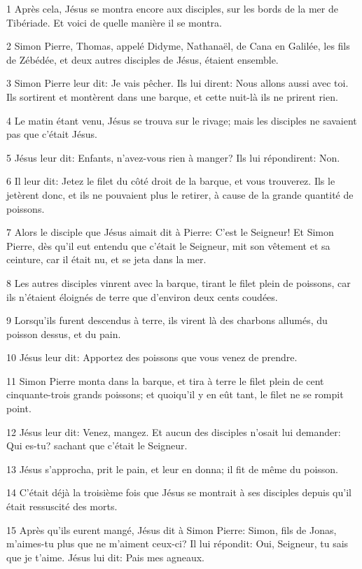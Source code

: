 \par 1 Après cela, Jésus se montra encore aux disciples, sur les bords de la mer de Tibériade. Et voici de quelle manière il se montra.
\par 2 Simon Pierre, Thomas, appelé Didyme, Nathanaël, de Cana en Galilée, les fils de Zébédée, et deux autres disciples de Jésus, étaient ensemble.
\par 3 Simon Pierre leur dit: Je vais pêcher. Ils lui dirent: Nous allons aussi avec toi. Ils sortirent et montèrent dans une barque, et cette nuit-là ils ne prirent rien.
\par 4 Le matin étant venu, Jésus se trouva sur le rivage; mais les disciples ne savaient pas que c'était Jésus.
\par 5 Jésus leur dit: Enfants, n'avez-vous rien à manger? Ils lui répondirent: Non.
\par 6 Il leur dit: Jetez le filet du côté droit de la barque, et vous trouverez. Ils le jetèrent donc, et ils ne pouvaient plus le retirer, à cause de la grande quantité de poissons.
\par 7 Alors le disciple que Jésus aimait dit à Pierre: C'est le Seigneur! Et Simon Pierre, dès qu'il eut entendu que c'était le Seigneur, mit son vêtement et sa ceinture, car il était nu, et se jeta dans la mer.
\par 8 Les autres disciples vinrent avec la barque, tirant le filet plein de poissons, car ils n'étaient éloignés de terre que d'environ deux cents coudées.
\par 9 Lorsqu'ils furent descendus à terre, ils virent là des charbons allumés, du poisson dessus, et du pain.
\par 10 Jésus leur dit: Apportez des poissons que vous venez de prendre.
\par 11 Simon Pierre monta dans la barque, et tira à terre le filet plein de cent cinquante-trois grands poissons; et quoiqu'il y en eût tant, le filet ne se rompit point.
\par 12 Jésus leur dit: Venez, mangez. Et aucun des disciples n'osait lui demander: Qui es-tu? sachant que c'était le Seigneur.
\par 13 Jésus s'approcha, prit le pain, et leur en donna; il fit de même du poisson.
\par 14 C'était déjà la troisième fois que Jésus se montrait à ses disciples depuis qu'il était ressuscité des morts.
\par 15 Après qu'ils eurent mangé, Jésus dit à Simon Pierre: Simon, fils de Jonas, m'aimes-tu plus que ne m'aiment ceux-ci? Il lui répondit: Oui, Seigneur, tu sais que je t'aime. Jésus lui dit: Pais mes agneaux.
